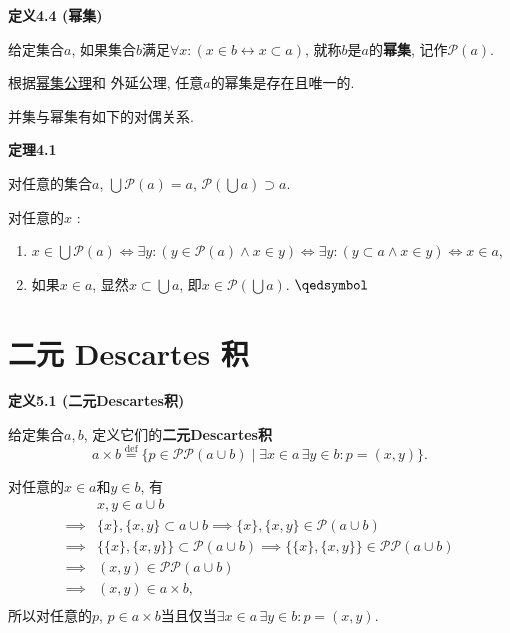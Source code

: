 \vspace{10pt}

\hypertarget{sec:定义4.4}{}
\noindent\textbf{定义4.4 (幂集)}

给定集合$a$, 如果集合$b$满足$\forall x:(x\in b\leftrightarrow x\subset a)$,
就称$b$是$a$的\textbf{幂集}, 记作$\mathcal{P}(a)$.

根据\href{../01 ZFC 公理/01 ZFC 公理#nameddest=sec:幂集公理}{幂集公理}和
外延公理, 任意$a$的幂集是存在且唯一的.

\vspace{10pt}

并集与幂集有如下的对偶关系.

\vspace{10pt}

\hypertarget{sec:定理4.1}{}
\noindent\textbf{定理4.1}

对任意的集合$a$, $\displaystyle\bigcup\mathcal{P}(a)=a$,
$\displaystyle\mathcal{P}\left(\bigcup a\right)\supset a$.


对任意的$x$ :

\begin{enumerate}
    \item $\displaystyle x\in\bigcup\mathcal{P}(a)\iff
    \exists y:(y\in\mathcal{P}(a)\land x\in y)\iff
    \exists y:(y\subset a\land x\in y)\iff x\in a$,
    \item 如果$x\in a$, 显然$\displaystyle x\subset\bigcup a$,
    即$\displaystyle x\in\mathcal{P}\left(\bigcup a\right)$. \hfill $\qedsymbol$
\end{enumerate}





\newpage

\section{二元 Descartes 积}

\hypertarget{sec:定义5.1}{}
\noindent\textbf{定义5.1 (二元Descartes积)}

给定集合$a,b$, 定义它们的\textbf{二元Descartes积}
\[
    a\times b\overset{\mathrm{def}}{=}\{p\in\mathcal{P}\mathcal{P}(a\cup b)
    \mid\exists x\in a\,\exists y\in b:p=(x,y)\}.
\]

\vspace{10pt}

对任意的$x\in a$和$y\in b$, 有
\[\begin{aligned}
    &x,y\in a\cup b\\
    \implies&\{x\},\{x,y\}\subset a\cup b
    \implies\{x\},\{x,y\}\in\mathcal{P}(a\cup b)\\
    \implies&\{\{x\},\{x,y\}\}\subset\mathcal{P}(a\cup b)
    \implies\{\{x\},\{x,y\}\}\in\mathcal{P}\mathcal{P}(a\cup b)\\
    \implies&(x,y)\in\mathcal{P}\mathcal{P}(a\cup b)\\
    \implies&(x,y)\in a\times b,\\[3pt]
\end{aligned}\]
所以对任意的$p$, $p\in a\times b$当且仅当$\exists x\in a\,\exists y\in b:p=(x,y)$.





